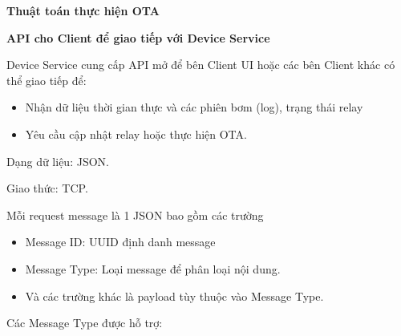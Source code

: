 \FloatBarrier
\textbf{Thuật toán thực hiện OTA}

\textbf{API cho Client để giao tiếp với Device Service }

Device Service cung cấp API mở để bên Client UI hoặc các bên Client khác có thể giao tiếp để:

\begin{itemize}
    \item Nhận dữ liệu thời gian thực và các phiên bơm (log), trạng thái relay
    \item Yêu cầu cập nhật relay hoặc thực hiện OTA.
\end{itemize}

Dạng dữ liệu: JSON.

Giao thức: TCP.

Mỗi request message là 1 JSON bao gồm các trường

\begin{itemize}
    \item Message ID: UUID định danh message 
    \item Message Type: Loại message để phân loại nội dung.
    \item Và các trường khác là payload tùy thuộc vào Message Type.
\end{itemize}

Các Message Type được hỗ trợ:

